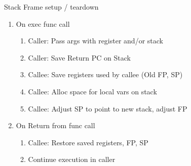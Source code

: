 \documentclass[10pt,landscape]{article}
\begin{document}
\begin{multicols*}{4}
Stack Frame setup / teardown
\begin{enumerate}
  \item On exec func call
    \begin{enumerate}
      \item Caller: Pass args with register and/or stack
      \item Caller: Save Return PC on Stack
      \item Callee: Save registers used by callee (Old FP, SP)
      \item Callee: Alloc space for local vars on stack
      \item Callee: Adjust SP to point to new stack, adjust FP
    \end{enumerate}
  \item On Return from func call
    \begin{enumerate}
      \item Callee: Restore saved registers, FP, SP
      \item Continue execution in caller
    \end{enumerate}
\end{enumerate}

\end{multicols*}
\end{document}
